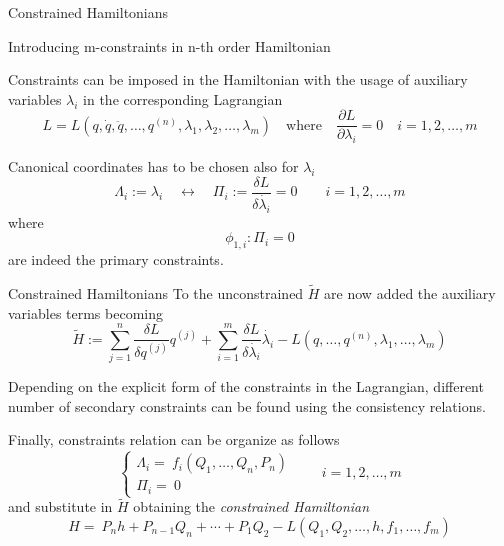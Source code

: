 \begin{frame}{Constrained Hamiltonians}
  \begin{alertblock}{Introducing m-constraints in n-th order Hamiltonian}
  \end{alertblock}
  Constraints can be imposed in the Hamiltonian with the usage of
  auxiliary variables $\lambda_i$ in the corresponding Lagrangian
  \begin{equation*}
    L = L(q, \dot{q}, \ddot{q}, \ldots, q^{(n)},
      \lambda_1, \lambda_2, \ldots, \lambda_m)
    \quad \text{where} \quad
    \frac{\partial L}{\partial \lambda_i} = 0 \quad i=1, 2, \ldots, m
  \end{equation*}

  Canonical coordinates has to be chosen also for $\lambda_i$
  \begin{equation*} \label{eq:def_canonical_coordinates_lambda}
    \Lambda_{i}:= \lambda_{i}
    \quad \leftrightarrow \quad
    \Pi_{i} := \frac{\delta L}{\delta \dot{\lambda_{i}}} = 0
    \qquad i = 1, 2, \ldots, m
  \end{equation*}
  where
  \begin{equation*}
    \phi_{1, i}: \Pi_i = 0
  \end{equation*}
  are indeed the primary constraints.
\end{frame}

\begin{frame}{Constrained Hamiltonians}
  To the unconstrained $\tilde{H}$ are now added the auxiliary
  variables terms becoming
  \begin{equation*}
    \tilde{H} :=
    \sum_{j=1}^{n} \frac{\delta L}{\delta q^{(j)}} q^{(j)} +
    \sum_{i=1}^{m} \frac{\delta L}{\delta \dot{\lambda_i}} \dot{\lambda_i} -
    L(q, \ldots, q^{(n)}, \lambda_1, \ldots, \lambda_m)
  \end{equation*}

  Depending on the explicit form of the constraints in the Lagrangian,
  different number of secondary constraints can be found using the consistency
  relations.

  Finally, constraints relation can be organize as follows
  \begin{equation*}
    \begin{cases}
      \Lambda_i =\ f_i(Q_1, \ldots, Q_n, P_n) \\
      \Pi_i =\ 0
    \end{cases}
    \qquad i = 1, 2, \ldots, m
  \end{equation*}
  and substitute in $\tilde{H}$ obtaining the \emph{constrained
  Hamiltonian}
  \begin{equation*}
    H =\ P_n h + P_{n-1} Q_n + \cdots + P_1 Q_2
       - L ( Q_1, Q_2, \ldots, h, f_1, \ldots, f_m)
  \end{equation*}
\end{frame}
